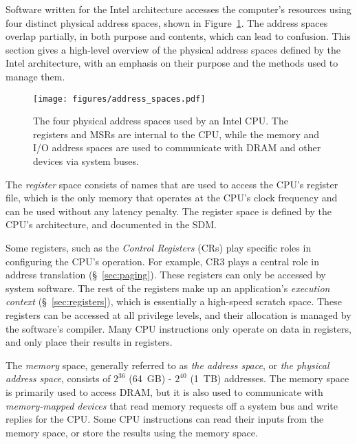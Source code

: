 \label{sec:address_spaces}


Software written for the Intel architecture accesses the computer's resources
using four distinct physical address spaces, shown in
Figure~\ref{fig:address_spaces}. The address spaces overlap partially, in both
purpose and contents, which can lead to confusion. This section gives a
high-level overview of the physical address spaces defined by the Intel
architecture, with an emphasis on their purpose and the methods used to manage
them.

\begin{figure}[hbtp]
  \centering
  \texttt{[image: figures/address\_spaces.pdf]}
  \caption{
    The four physical address spaces used by an Intel CPU. The registers and
    MSRs are internal to the CPU, while the memory and I/O address spaces are
    used to communicate with DRAM and other devices via system buses.
  }
  \label{fig:address_spaces}
\end{figure}

The \textit{register} space consists of names that are used to access the CPU's
register file, which is the only memory that operates at the CPU's clock
frequency and can be used without any latency penalty. The register space is
defined by the CPU's architecture, and documented in the SDM.

Some registers, such as the \textit{Control Registers} (CRs) play specific
roles in configuring the CPU's operation. For example, CR3 plays a central role
in address translation (\S~\ref{sec:paging}). These registers can only be
accessed by system software. The rest of the registers make up an application's
\textit{execution context} (\S~\ref{sec:registers}), which is essentially a
high-speed scratch space. These registers can be accessed at all privilege
levels, and their allocation is managed by the software's compiler. Many CPU
instructions only operate on data in registers, and only place their results in
registers.

The \textit{memory} space, generally referred to as \textit{the address space},
or \textit{the physical address space}, consists of $2^{36}$ (64~GB) - $2^{40}$
(1~TB) addresses. The memory space is primarily used to access DRAM, but it is
also used to communicate with \textit{memory-mapped devices} that read memory
requests off a system bus and write replies for the CPU. Some CPU instructions
can read their inputs from the memory space, or store the results using the
memory space.

